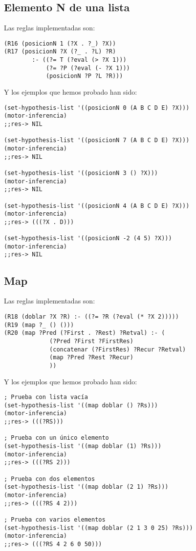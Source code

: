 \documentclass[nochap]{apuntes}
\begin{document}
\subsection*{Elemento N de una lista}
Las reglas implementadas son:\\
\begin{lstlisting}[frame=single]
(R16 (posicionN 1 (?X . ?_) ?X))
(R17 (posicionN ?X (?_ . ?L) ?R) 
		:- ((?= T (?eval (> ?X 1)))
			(?= ?P (?eval (- ?X 1)))
			(posicionN ?P ?L ?R)))
\end{lstlisting}
Y los ejemplos que hemos probado han sido:\\


\begin{lstlisting}[frame=single]
(set-hypothesis-list '((posicionN 0 (A B C D E) ?X)))
(motor-inferencia)
;;res-> NIL

(set-hypothesis-list '((posicionN 7 (A B C D E) ?X)))
(motor-inferencia)
;;res-> NIL

(set-hypothesis-list '((posicionN 3 () ?X)))
(motor-inferencia)
;;res-> NIL

(set-hypothesis-list '((posicionN 4 (A B C D E) ?X)))
(motor-inferencia)
;;res-> (((?X . D)))

(set-hypothesis-list '((posicionN -2 (4 5) ?X)))
(motor-inferencia)
;;res-> NIL
\end{lstlisting}

\subsection*{Map}
Las reglas implementadas son:\\

\begin{lstlisting}[frame=single]
(R18 (doblar ?X ?R) :- ((?= ?R (?eval (* ?X 2)))))
(R19 (map ?_ () ()))
(R20 (map ?Pred (?First . ?Rest) ?Retval) :- (
			 (?Pred ?First ?FirstRes)
			 (concatenar (?FirstRes) ?Recur ?Retval)
			 (map ?Pred ?Rest ?Recur)
			 ))
\end{lstlisting}
Y los ejemplos que hemos probado han sido:\\


\begin{lstlisting}[frame=single]
; Prueba con lista vacía
(set-hypothesis-list '((map doblar () ?Rs)))
(motor-inferencia)
;;res-> (((?RS)))

; Prueba con un único elemento
(set-hypothesis-list '((map doblar (1) ?Rs)))
(motor-inferencia)
;;res-> (((?RS 2)))

; Prueba con dos elementos
(set-hypothesis-list '((map doblar (2 1) ?Rs)))
(motor-inferencia)
;;res-> (((?RS 4 2)))

; Prueba con varios elementos
(set-hypothesis-list '((map doblar (2 1 3 0 25) ?Rs)))
(motor-inferencia)
;;res-> (((?RS 4 2 6 0 50)))
\end{lstlisting}
\end{document}
